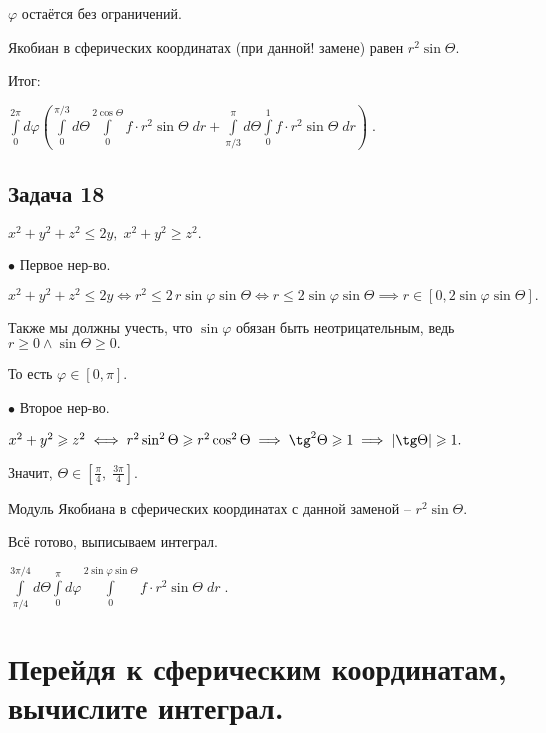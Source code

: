 \documentclass[a4paper, fleqn]{article}
\begin{document}
    $\varphi$ остаётся без ограничений.
    
    Якобиан в сферических координатах (при данной! замене) равен $r^2 \sin \Theta.$
    
    Итог:
    
    $\boxed{\displaystyle \int\limits_{0 }^{2 \pi} d \varphi\left( 
    \int\limits_{0 }^{\pi/3} d \Theta \int\limits_{0 }^{2 \cos \Theta} f \cdot r^2 \sin \Theta \; dr + 
    \int\limits_{\pi/3 }^{\pi} d \Theta \int\limits_{0 }^{1} f \cdot r^2 \sin \Theta \; dr
    \right) } \; .$
    
    
    
    
    \subsection*{Задача 18}
    
    $x^2 + y^2 + z^2 \leq 2y, \; x^2 + y^2 \geq z^2.$
    
    
    $\bullet$  Первое нер-во.
    
    \onehalfspacing $x^2 + y^2 + z^2 \leq 2y \iff r^2 \leq 2 \, r \sin \varphi \sin \Theta \iff r \leq 2 \sin \varphi \sin \Theta \implies r \in [0, 2 \sin \varphi \sin \Theta].$
    
    \singlespacing Также мы должны учесть, что $\sin{\varphi}$ обязан быть неотрицательным, ведь $r \geq 0 \land \sin \Theta \geq 0.$
    
    То есть $\varphi \in [0, \pi].$
    
    $\bullet$  Второе нер-во.
    
    $x^2 + y^2 \geq z^2 \iff r^2 \sin^2 \Theta \geq r^2 \cos^2 \Theta \implies \tg^2 \Theta \geq 1 \implies |\tg \Theta| \geq 1.$
    
    Значит, $\Theta \in \left[ \frac{\pi}{4}, \; \frac{3\pi}{4} \right].$
    
    Модуль Якобиана в сферических координатах с данной заменой -- $r^2 \sin \Theta.$
    
    Всё готово, выписываем интеграл.
    
    $\boxed{\displaystyle
    \int \limits_{\pi/4}^{3 \pi /4} d \Theta \int \limits_{0}^{\pi} d \varphi \int \limits_{0}^{2 \sin \varphi \sin \Theta} f \cdot r^2 \sin \Theta \; dr} \; .$
    
    \section*{Перейдя к сферическим координатам, вычислите интеграл.}
    
\end{document}
